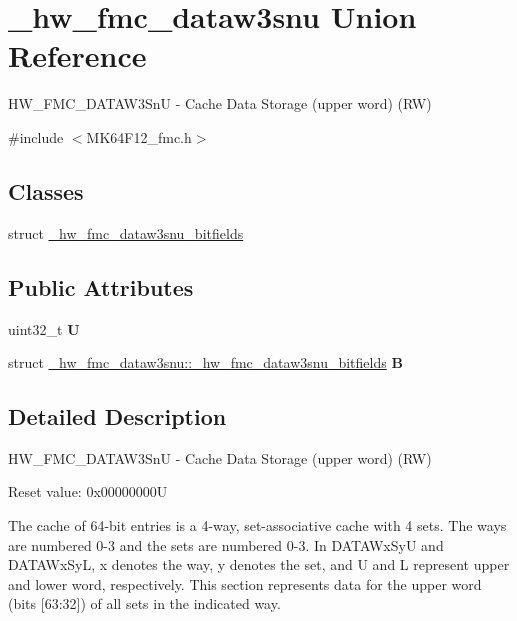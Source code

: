 \hypertarget{union__hw__fmc__dataw3snu}{}\section{\+\_\+hw\+\_\+fmc\+\_\+dataw3snu Union Reference}
\label{union__hw__fmc__dataw3snu}


H\+W\+\_\+\+F\+M\+C\+\_\+\+D\+A\+T\+A\+W3\+SnU -\/ Cache Data Storage (upper word) (RW)  




{\ttfamily \#include $<$M\+K64\+F12\+\_\+fmc.\+h$>$}

\subsection*{Classes}
\begin{DoxyCompactItemize}
\item 
struct \hyperlink{struct__hw__fmc__dataw3snu_1_1__hw__fmc__dataw3snu__bitfields}{\+\_\+hw\+\_\+fmc\+\_\+dataw3snu\+\_\+bitfields}
\end{DoxyCompactItemize}
\subsection*{Public Attributes}
\begin{DoxyCompactItemize}
\item 
uint32\+\_\+t {\bfseries U}\hypertarget{union__hw__fmc__dataw3snu_a136c6d79e35bcb4f580100873f675785}{}\label{union__hw__fmc__dataw3snu_a136c6d79e35bcb4f580100873f675785}

\item 
struct \hyperlink{struct__hw__fmc__dataw3snu_1_1__hw__fmc__dataw3snu__bitfields}{\+\_\+hw\+\_\+fmc\+\_\+dataw3snu\+::\+\_\+hw\+\_\+fmc\+\_\+dataw3snu\+\_\+bitfields} {\bfseries B}\hypertarget{union__hw__fmc__dataw3snu_a5a3400be2a4edf2767ca18f5a670eafa}{}\label{union__hw__fmc__dataw3snu_a5a3400be2a4edf2767ca18f5a670eafa}

\end{DoxyCompactItemize}


\subsection{Detailed Description}
H\+W\+\_\+\+F\+M\+C\+\_\+\+D\+A\+T\+A\+W3\+SnU -\/ Cache Data Storage (upper word) (RW) 

Reset value\+: 0x00000000U

The cache of 64-\/bit entries is a 4-\/way, set-\/associative cache with 4 sets. The ways are numbered 0-\/3 and the sets are numbered 0-\/3. In D\+A\+T\+A\+Wx\+SyU and D\+A\+T\+A\+Wx\+SyL, x denotes the way, y denotes the set, and U and L represent upper and lower word, respectively. This section represents data for the upper word (bits \mbox{[}63\+:32\mbox{]}) of all sets in the indicated way. 

